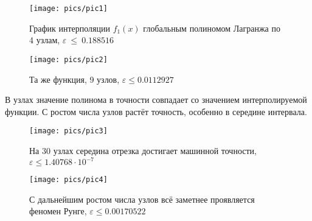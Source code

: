 \begin{figure}[H]
    \centering
    \caption{График интерполяции $f_1(x)$ глобальным полиномом Лагранжа по 4 узлам, $\varepsilon~\le~0.188516$}
    \texttt{[image: pics/pic1]}
    \label{pic:1}
\end{figure}

\begin{figure}[H]
    \centering
    \caption{Та же функция, 9 узлов, $\varepsilon \le 0.0112927$}
    \texttt{[image: pics/pic2]}
    \label{pic:2}
\end{figure}

В узлах значение полинома в точности совпадает со значением интерполируемой функции. С ростом числа узлов растёт точность, особенно в середине интервала.

\begin{figure}[H]
    \centering
    \caption{На $30$ узлах середина отрезка достигает машинной точности, $\varepsilon \le 1.40768\cdot10^{-7}$}
    \texttt{[image: pics/pic3]}
    \label{pic:3}
\end{figure}

\begin{figure}[H]
    \centering
    \caption{С дальнейшим ростом числа узлов всё заметнее проявляется феномен Рунге, $\varepsilon \le 0.00170522$}
    \texttt{[image: pics/pic4]}
    \label{pic:4}
\end{figure}